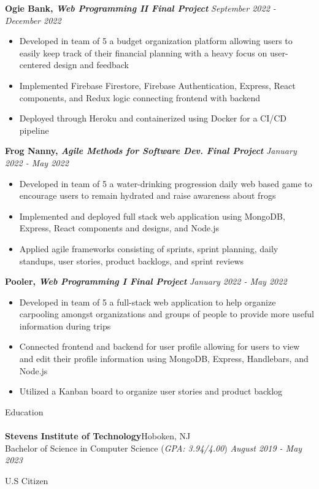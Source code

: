\documentclass[10pt]{article}
\newcommand{\lineunder} {
    \vspace*{-8pt} \\
    \hspace*{-18pt} \hrulefill \\
}
\newcommand{\header}[1]{
    {\hspace*{-18pt}\vspace*{6pt} #1}
    \vspace*{-6pt} \lineunder
}
\begin{document}
\textbf{Ogie Bank, \textit{Web Programming II Final Project}} \hfill \textit{September 2022 - December 2022}
\begin{itemize}[noitemsep, topsep=0.5pt, parsep=0pt,partopsep=0pt]
    \item Developed in team of 5 a budget organization platform allowing users to easily keep track of their financial planning with a heavy focus on user-centered design and feedback
    \item Implemented Firebase Firestore, Firebase Authentication, Express, React components, and Redux logic connecting frontend with backend
    \item Deployed through Heroku and containerized using Docker for a CI/CD pipeline
\end{itemize}

\textbf{Frog Nanny, \textit{Agile Methods for Software Dev. Final Project}}  \hfill \textit{January 2022 - May 2022}
\begin{itemize}[noitemsep, topsep=0.5pt, parsep=0pt,partopsep=0pt]
    \item Developed in team of 5 a water-drinking progression daily web based game to encourage users to remain hydrated and raise awareness about frogs
    \item Implemented and deployed full stack web application using MongoDB, Express, React components and designs, and Node.js
    \item Applied agile frameworks consisting of sprints, sprint planning, daily standups, user stories, product backlogs, and sprint reviews
\end{itemize}

\textbf{Pooler, \textit{Web Programming I Final Project}} \hfill \textit{January 2022 - May 2022}
\begin{itemize}[noitemsep, topsep=0.5pt, parsep=0pt,partopsep=0pt]
    \item Developed in team of 5 a full-stack web application to help organize carpooling amongst organizations and groups of people to provide more useful information during trips
    \item Connected frontend and backend for user profile allowing for users to view and edit their profile information using MongoDB, Express, Handlebars, and Node.js
    \item Utilized a Kanban board to organize user stories and product backlog
\end{itemize}

\header{Education}
\textbf{Stevens Institute of Technology}\hfill Hoboken, NJ\\
Bachelor of Science in Computer Science (\textit{GPA: 3.94/4.00}) \hfill \textit{August 2019 - May 2023}\\
\vspace{2mm}

\vspace{2mm}
\begin{center}
    U.S Citizen
\end{center}
\end{document}
